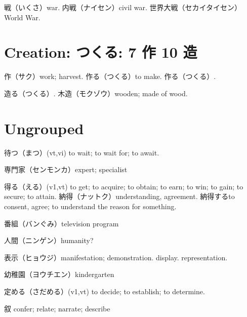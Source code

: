 戦（いくさ）war.
内戦（ナイセン）civil war.
世界大戦（セカイタイセン）World War.

\section{Creation: つくる: 7 作 10 造}

作（サク）work; harvest.
作る（つくる）to make.
作る（つくる）.

造る（つくる）.
木造（モクゾウ）wooden; made of wood.

\section{Ungrouped}

待つ（まつ）(vt,vi) to wait; to wait for; to await.

専門家（センモンカ）expert; specialist

得る（える）(v1,vt) to get; to acquire; to obtain; to earn; to win; to gain; to secure; to attain.
納得（ナットク）understanding, agreement.
納得するto consent, agree; to understand the reason for something.

番組（バンぐみ）television program

人間（ニンゲン）humanity?

表示（ヒョウジ）manifestation; demonstration. display. representation.

幼稚園（ヨウチエン）kindergarten

定める（さだめる）(v1,vt) to decide; to establish; to determine.

叙 confer; relate; narrate; describe
